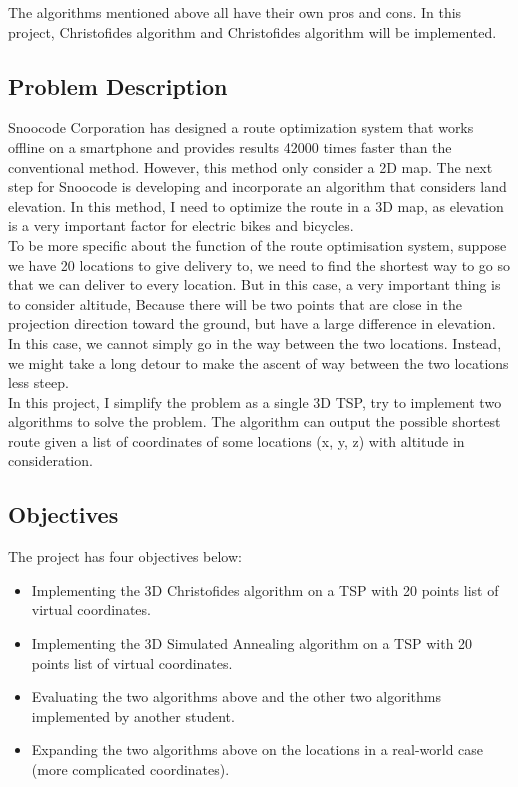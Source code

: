 \documentclass[project-plan]{report-template}
\begin{document}
The algorithms mentioned above all have their own pros and cons. In this project, Christofides algorithm and Christofides algorithm will be implemented.



\subsection {Problem Description}
Snoocode Corporation has designed a route optimization system that works offline on a smartphone and provides 
results 42000 times faster than the conventional method. However, this method only consider a 2D map.
The next step for Snoocode is developing and incorporate an algorithm that considers land elevation. 
In this method, I need to optimize the route in a 3D map, as elevation is a very important factor for 
electric bikes and bicycles. \\

To be more specific about the function of the route optimisation system, suppose we have 20 locations to
give delivery to, we need to find the shortest way to go so that we can deliver to every location. 
But in this case, a very important thing is to consider altitude, 
Because there will be two points that are close in the projection direction toward the ground, 
but have a large difference in elevation. In this case, we cannot simply go in the way between the two locations.
Instead, we might take a long detour to make the ascent of way between the two locations less steep.\\

In this project, I simplify the problem as a single 3D TSP, try to implement two algorithms to solve the problem.
The algorithm can output the possible shortest route given a list of coordinates of some locations
(x, y, z) with altitude in consideration.

\subsection {Objectives}
The project has four objectives below:
\begin{itemize}
    \item Implementing the 3D Christofides algorithm on a TSP with 20 points list of virtual coordinates.
    \item Implementing the 3D Simulated Annealing algorithm on a TSP with 20 points list of virtual coordinates.
    \item Evaluating the two algorithms above and the other two algorithms implemented by another student.
    \item Expanding the two algorithms above on the locations in a real-world case (more complicated coordinates).
\end{itemize}
\end{document}
